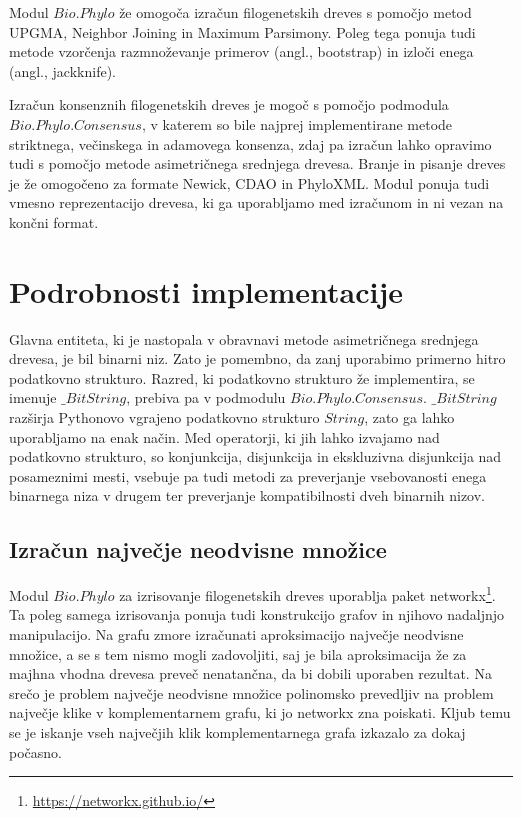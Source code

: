 \documentclass[a4paper, 12pt]{book}
\begin{document}
\noindent Modul $Bio.Phylo$ že omogoča izračun filogenetskih dreves s pomočjo 
metod UPGMA, Neighbor Joining in Maximum Parsimony. Poleg tega ponuja 
tudi metode vzorčenja razmnoževanje primerov (angl., bootstrap) in izloči enega (angl., jackknife).  

Izračun konsenznih filogenetskih dreves je mogoč s pomočjo podmodula 
$Bio.Phylo.Consensus$, v katerem so bile najprej implementirane metode 
striktnega, večinskega in adamovega konsenza, zdaj pa izračun lahko 
opravimo tudi s pomočjo metode asimetričnega srednjega drevesa. Branje 
in pisanje dreves je že omogočeno za formate Newick, CDAO in PhyloXML. 
Modul ponuja tudi vmesno reprezentacijo drevesa, ki ga uporabljamo med 
izračunom in ni vezan na končni format.

\section{Podrobnosti implementacije}
Glavna entiteta, ki je nastopala v obravnavi metode asimetričnega srednjega 
drevesa, je bil binarni niz. Zato je pomembno, da zanj uporabimo primerno hitro 
podatkovno strukturo. Razred, ki podatkovno strukturo že implementira, se 
imenuje $\_BitString$, prebiva pa v podmodulu $Bio.Phylo.Consensus$. 
$\_BitString$ razširja Pythonovo vgrajeno podatkovno strukturo $String$, 
zato ga lahko uporabljamo na enak način. Med operatorji, ki jih lahko izvajamo 
nad podatkovno strukturo, so konjunkcija, disjunkcija in ekskluzivna 
disjunkcija nad posameznimi mesti, vsebuje pa tudi metodi za preverjanje 
vsebovanosti enega binarnega niza v drugem ter preverjanje kompatibilnosti 
dveh binarnih nizov. 

\subsection{Izračun največje neodvisne množice}
Modul $Bio.Phylo$ za izrisovanje filogenetskih dreves uporablja paket 
networkx\footnote{\url{https://networkx.github.io/}}. Ta poleg samega 
izrisovanja ponuja tudi konstrukcijo grafov in njihovo nadaljnjo 
manipulacijo. Na grafu zmore izračunati aproksimacijo največje neodvisne 
množice, a se s tem nismo mogli zadovoljiti, saj je bila aproksimacija že 
za majhna vhodna drevesa preveč nenatančna, da bi dobili uporaben rezultat. 
Na srečo je problem največje neodvisne množice polinomsko prevedljiv na 
problem največje klike v komplementarnem grafu, ki jo networkx zna poiskati.
Kljub temu se je iskanje vseh največjih klik komplementarnega grafa izkazalo 
za dokaj počasno. 
\end{document}
